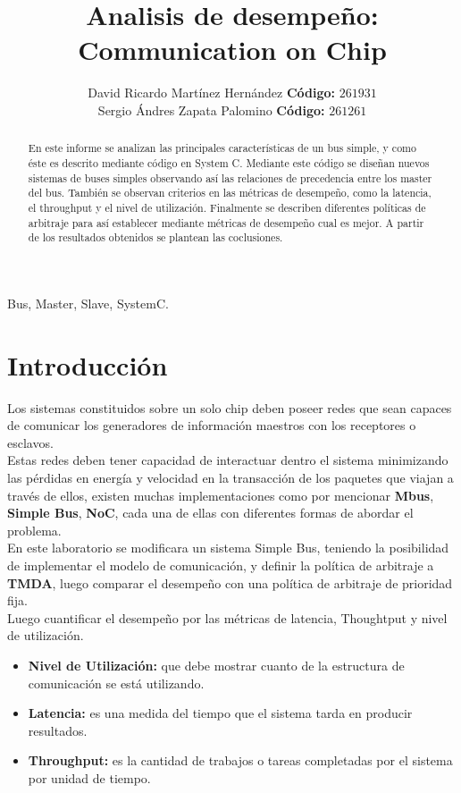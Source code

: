 \documentclass[twocolumn]{IEEEtran}
\begin{document}
\title{Analisis de desempeño: Communication on Chip}
\author{David Ricardo Martínez Hernández \textbf{Código:} $261931$\\
	Sergio Ándres Zapata Palomino \textbf{Código:} $261261$}
\maketitle
{}

\begin{abstract}
 En este informe se analizan las principales características de un bus simple, y como éste es descrito mediante código en System C. Mediante este código se diseñan nuevos sistemas de buses simples observando así las relaciones de precedencia entre los master del bus. También se observan criterios en las métricas de desempeño, como la latencia, el throughput y el nivel de utilización. Finalmente se describen diferentes políticas de arbitraje para así establecer mediante métricas de desempeño cual es mejor. A partir de los resultados obtenidos se plantean las coclusiones.
\end{abstract}

\begin{keywords}
 Bus, Master, Slave, SystemC.
\end{keywords}

\section{Introducción}
\noindent
Los sistemas constituidos sobre un solo chip  deben poseer redes que sean capaces de comunicar los generadores de información maestros con los receptores o esclavos.\\
Estas redes deben tener capacidad de interactuar dentro el sistema minimizando las pérdidas en energía y velocidad en la transacción de los paquetes que viajan a través de ellos, existen muchas implementaciones como por mencionar \textbf{Mbus}, \textbf{Simple Bus}, \textbf{NoC}, cada una de ellas con diferentes formas de abordar el problema.\\
En este laboratorio se modificara un sistema Simple Bus, teniendo la posibilidad de implementar el modelo de comunicación, y definir la política de arbitraje a \textbf{TMDA}, luego comparar el desempeño con una política de arbitraje de prioridad fija.\\
Luego cuantificar el desempeño por las métricas de latencia, Thoughtput y nivel de utilización.
\begin{itemize}
 \item \textbf{Nivel de Utilización:} que debe mostrar cuanto de la estructura de comunicación se está utilizando.
 \item \textbf{Latencia:} es una medida del tiempo que el sistema tarda en producir resultados.
 \item \textbf{Throughput:} es la cantidad de trabajos o tareas completadas por el sistema por unidad de tiempo.
\end{itemize}
\end{document}
